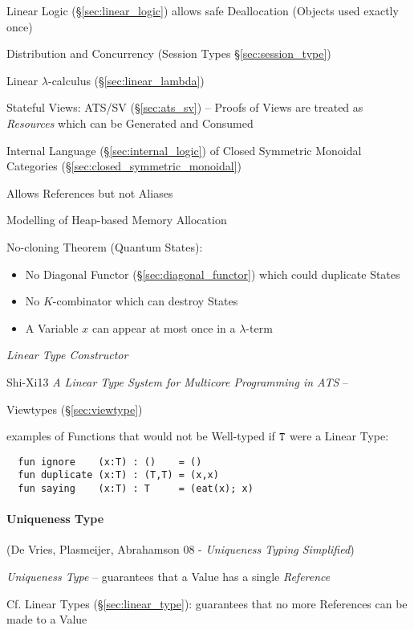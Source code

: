 Linear Logic (\S\ref{sec:linear_logic}) allows safe Deallocation
(Objects used exactly once)

Distribution and Concurrency (Session Types \S\ref{sec:session_type})

Linear $\lambda$-calculus (\S\ref{sec:linear_lambda})

Stateful Views: ATS/SV (\S\ref{sec:ats_sv}) -- Proofs of Views are
treated as \emph{Resources} which can be Generated and Consumed

Internal Language (\S\ref{sec:internal_logic}) of Closed Symmetric
Monoidal Categories (\S\ref{sec:closed_symmetric_monoidal})

Allows References but not Aliases

Modelling of Heap-based Memory Allocation

No-cloning Theorem (Quantum States):
\begin{itemize}
  \item No Diagonal Functor (\S\ref{sec:diagonal_functor})
    which could duplicate States
  \item No $K$-combinator which can destroy States
  \item A Variable $x$ can appear at most once in a $\lambda$-term
\end{itemize}

\emph{Linear Type Constructor} %


Shi-Xi13 \emph{A Linear Type System for Multicore Programming in ATS} --

\fist Viewtypes (\S\ref{sec:viewtype})

examples of Functions that would not be Well-typed if $\mathtt{T}$ were
a Linear Type:
\begin{verbatim}
  fun ignore    (x:T) : ()    = ()
  fun duplicate (x:T) : (T,T) = (x,x)
  fun saying    (x:T) : T     = (eat(x); x)
\end{verbatim}



\paragraph{Uniqueness Type}\label{sec:uniqueness_type}\hfill

(De Vries, Plasmeijer, Abrahamson 08 - \emph{Uniqueness Typing
  Simplified})

\emph{Uniqueness Type} -- guarantees that a Value has a single
\emph{Reference}

\fist Cf. Linear Types (\S\ref{sec:linear_type}): guarantees that no
more References can be made to a Value

